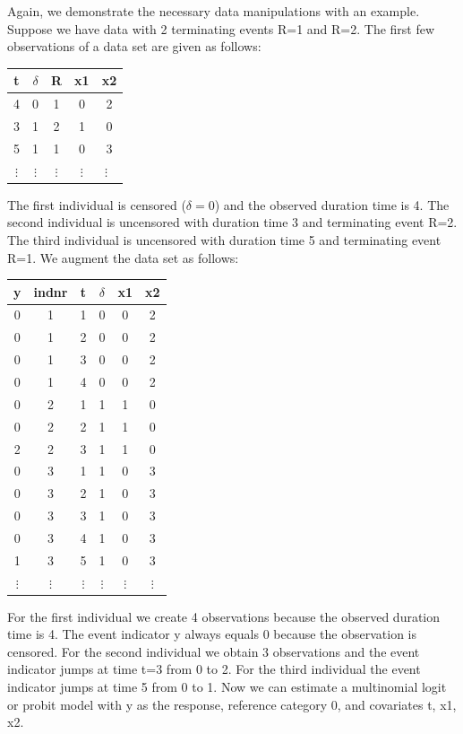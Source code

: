 \documentclass[11pt,a4paper,twoside]{bayesxarticle}
\begin{document}
Again, we demonstrate the necessary data manipulations with an
example. Suppose we have data with 2 terminating events R=1 and R=2.
The first few observations of a data set are given as follows:

\begin{center}
\begin{tabular}{c|c|c|c|c}
 t & $\delta$ & R & x1 & x2\\
 \hline\hline
 4 & 0    &  1 & 0  & 2\\
 \hline
 3 & 1    &  2 & 1  & 0\\
 \hline
 5 & 1    &  1 & 0  & 3\\
 \hline
 $\vdots$ & $\vdots$ & $\vdots$ & $\vdots$ & $\vdots$\
\end{tabular}
\end{center}

The first individual is censored ($\delta=0$) and the observed
duration time is 4. The second individual is uncensored with
duration time 3 and terminating event R=2. The third individual is
uncensored with duration time 5 and terminating event R=1. We
augment the data set as follows:

\begin{center}
\begin{tabular}{c|c|c|c|c|c}
y & indnr & t & $\delta$ &  x1 & x2\\\hline\hline
0 &  1  &  1 & 0  &  0 &  2\\
0 &  1  &  2 & 0  &  0 &  2\\
0 &  1  &  3 & 0  &  0 &  2\\
0 &  1  &  4 & 0  &  0 &  2\\\hline
0 &  2  &  1 & 1  &  1 &  0\\
0 &  2  &  2 & 1  &  1 &  0\\
2 &  2  &  3 & 1  &  1 &  0\\\hline
0 &  3  &  1 & 1  &  0 &  3\\
0 &  3  &  2 & 1  &  0 &  3\\
0 &  3  &  3 & 1  &  0 &  3\\
0 &  3  &  4 & 1  &  0 &  3\\
1 &  3  &  5 & 1  &  0 & 3\\\hline $\vdots$ & $\vdots$ & $\vdots$ &
$\vdots$ & $\vdots$ & $\vdots$
\end{tabular}
\end{center}

For the first individual we create 4 observations because the
observed duration time is 4. The event indicator y always equals 0
because the observation is censored. For the second individual we
obtain 3 observations and the event indicator jumps at time t=3 from
0 to 2. For the third individual the event indicator jumps at time 5
from 0 to 1. Now we can estimate a multinomial logit or probit model
with y as the response, reference category 0, and covariates t, x1,
x2.
\end{document}
